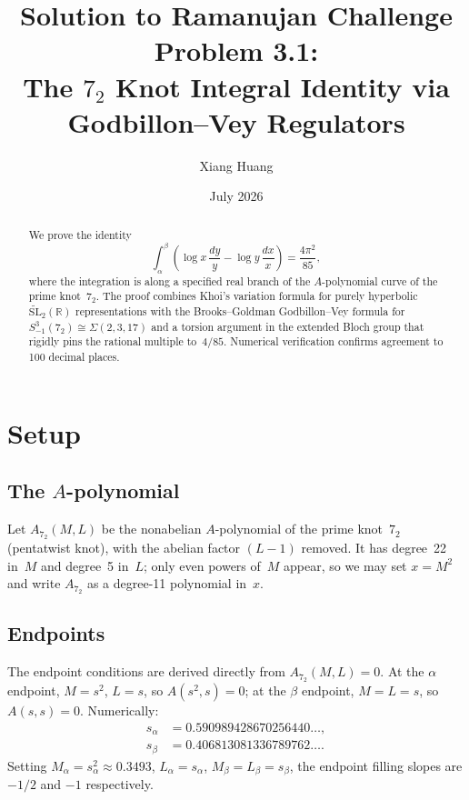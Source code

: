 \documentclass[11pt]{article}
\title{Solution to Ramanujan Challenge Problem 3.1:\\
The $7_2$ Knot Integral Identity via Godbillon--Vey Regulators}
\author{Xiang Huang}
\date{July 2026}
\theoremstyle{remark}
\begin{document}
\maketitle

\begin{abstract}
We prove the identity
\[
\int_{\alpha}^{\beta}
\left(\log x \,\frac{dy}{y} - \log y \,\frac{dx}{x}\right)
= \frac{4\pi^2}{85},
\]
where the integration is along a specified real branch of the
$A$-polynomial curve of the prime knot~$7_2$.
The proof combines Khoi's variation formula for purely hyperbolic
$\widetilde{\mathrm{SL}}_2(\mathbb{R})$ representations with
the Brooks--Goldman Godbillon--Vey formula for
$S^3_{-1}(7_2) \cong \Sigma(2,3,17)$ and a torsion argument
in the extended Bloch group that rigidly pins the rational
multiple to~$4/85$.
Numerical verification confirms agreement to 100 decimal places.
\end{abstract}

\section{Setup}

\subsection{The $A$-polynomial}

Let $A_{7_2}(M,L)$ be the nonabelian $A$-polynomial of the prime
knot~$7_2$ (pentatwist knot), with the abelian factor $(L-1)$
removed.  It has degree~22 in~$M$ and degree~5 in~$L$; only even
powers of~$M$ appear, so we may set $x = M^2$ and write
$A_{7_2}$ as a degree-11 polynomial in~$x$.

\subsection{Endpoints}

The endpoint conditions are derived directly from $A_{7_2}(M,L) = 0$.
At the $\alpha$ endpoint, $M = s^2$, $L = s$, so
$A(s^2, s) = 0$; at the $\beta$ endpoint, $M = L = s$,
so $A(s, s) = 0$.  Numerically:
\begin{align*}
s_\alpha &= 0.590989428670256440\ldots, \\
s_\beta  &= 0.406813081336789762\ldots.
\end{align*}
Setting $M_\alpha = s_\alpha^2 \approx 0.3493$,
$L_\alpha = s_\alpha$,
$M_\beta = L_\beta = s_\beta$, the endpoint filling slopes are
$-1/2$ and $-1$ respectively.
\end{document}
